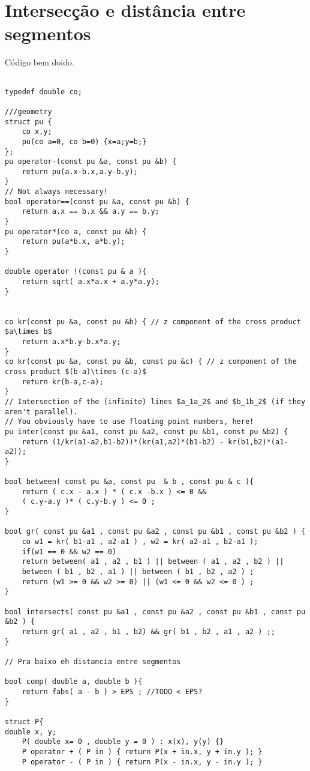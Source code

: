 \section{Intersecção e distância entre segmentos}

Código bem doido.
\begin{multicols}{2}
	\begin{lstlisting}

typedef double co;

///geometry
struct pu {
	co x,y;
	pu(co a=0, co b=0) {x=a;y=b;}
};
pu operator-(const pu &a, const pu &b) {
	return pu(a.x-b.x,a.y-b.y);
}
// Not always necessary!
bool operator==(const pu &a, const pu &b) {
	return a.x == b.x && a.y == b.y;
}
pu operator*(co a, const pu &b) {
	return pu(a*b.x, a*b.y);
}

double operator !(const pu & a ){
	return sqrt( a.x*a.x + a.y*a.y);
}


co kr(const pu &a, const pu &b) { // z component of the cross product $a\times b$
	return a.x*b.y-b.x*a.y;
}
co kr(const pu &a, const pu &b, const pu &c) { // z component of the cross product $(b-a)\times (c-a)$
	return kr(b-a,c-a);
}
// Intersection of the (infinite) lines $a_1a_2$ and $b_1b_2$ (if they aren't parallel).
// You obviously have to use floating point numbers, here!
pu inter(const pu &a1, const pu &a2, const pu &b1, const pu &b2) {
	return (1/kr(a1-a2,b1-b2))*(kr(a1,a2)*(b1-b2) - kr(b1,b2)*(a1-a2));
}

bool between( const pu &a, const pu  & b , const pu & c ){
	return ( c.x - a.x ) * ( c.x -b.x ) <= 0 &&
	( c.y-a.y )* ( c.y-b.y ) <= 0 ;
}

bool gr( const pu &a1 , const pu &a2 , const pu &b1 , const pu &b2 ) {
	co w1 = kr( b1-a1 , a2-a1 ) , w2 = kr( a2-a1 , b2-a1 );
	if(w1 == 0 && w2 == 0)
	return between( a1 , a2 , b1 ) || between ( a1 , a2 , b2 ) ||
	between ( b1 , b2 , a1 ) || between ( b1 , b2 , a2 ) ;
	return (w1 >= 0 && w2 >= 0) || (w1 <= 0 && w2 <= 0 ) ;
}

bool intersects( const pu &a1 , const pu &a2 , const pu &b1 , const pu &b2 ) {
	return gr( a1 , a2 , b1 , b2) && gr( b1 , b2 , a1 , a2 ) ;; 
}

// Pra baixo eh distancia entre segmentos

bool comp( double a, double b ){
	return fabs( a - b ) > EPS ; //TODO < EPS?
}

struct P{
double x, y;
	P( double x= 0 , double y = 0 ) : x(x), y(y) {}
	P operator + ( P in ) { return P(x + in.x, y + in.y ); } 
	P operator - ( P in ) { return P(x - in.x, y - in.y ); } 
	

\end{lstlisting}
\end{multicols}
